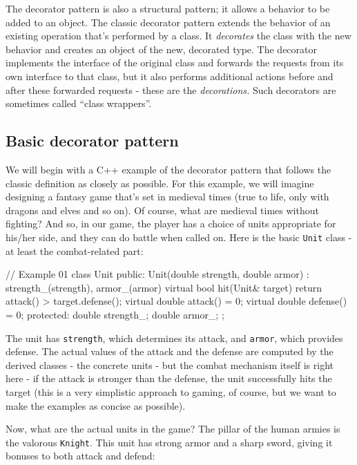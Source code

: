 The decorator pattern is also a structural pattern; it allows a behavior to be added to an object. The classic decorator pattern extends the behavior of an existing operation that's performed by a class. It \emph{decorates} the class with the new behavior and creates an object of the new, decorated type. The decorator implements the interface of the original class and forwards the requests from its own interface to that class, but it also performs additional actions before and after these forwarded requests - these are the \emph{decorations.} Such decorators are sometimes called ``class wrappers''.

\subsection{Basic decorator pattern}

We will begin with a C++ example of the decorator pattern that follows the classic definition as closely as possible. For this example, we will imagine designing a fantasy game that's set in medieval times (true to life, only with dragons and elves and so on). Of course, what are medieval times without fighting? And so, in our game, the player has a choice of units appropriate for his/her side, and they can do battle when called on. Here is the basic \texttt{Unit} class - at least the combat-related part:

\begin{code}
// Example 01
class Unit {
  public:
  Unit(double strength, double armor) :
    strength_(strength), armor_(armor) {}
  virtual bool hit(Unit& target) {
    return attack() > target.defense();
  }
  virtual double attack() = 0;
  virtual double defense() = 0;
  protected:
  double strength_;
  double armor_;
};
\end{code}

The unit has \texttt{strength}, which determines its attack, and \texttt{armor}, which provides defense. The actual values of the attack and the defense are computed by the derived classes - the concrete units - but the combat mechanism itself is right here - if the attack is stronger than the defense, the unit successfully hits the target (this is a very simplistic approach to gaming, of course, but we want to make the examples as concise as possible).

Now, what are the actual units in the game? The pillar of the human armies is the valorous \texttt{Knight}. This unit has strong armor and a sharp sword, giving it bonuses to both attack and defend:

